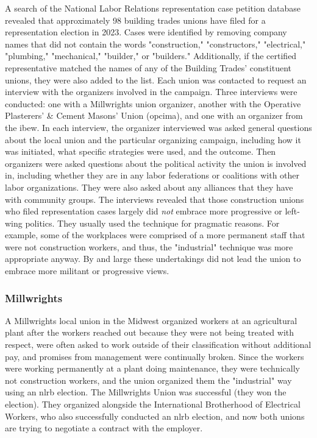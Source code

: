\documentclass[12pt]{article}
\begin{document}
A search of the National Labor Relations representation case petition database revealed that approximately 98 building trades unions have filed for a representation election in 2023. Cases were identified by removing company names that did not contain the words "construction," "constructors," "electrical," "plumbing," "mechanical," "builder," or "builders." Additionally, if the certified representative matched the names of any of the Building Trades’ constituent unions, they were also added to the list. Each union was contacted to request an interview with the organizers involved in the campaign. Three interviews were conducted: one with a Millwrights union organizer, another with the Operative Plasterers' \& Cement Masons' Union (\acrshort{opcima}), and one with an organizer from the \acrfull{ibew}. In each interview, the organizer interviewed was asked general questions about the local union and the particular organizing campaign, including how it was initiated, what specific strategies were used, and the outcome. Then organizers were asked questions about the political activity the union is involved in, including whether they are in any labor federations or coalitions with other labor organizations. They were also asked about any alliances that they have with community groups. The interviews revealed that those construction unions who filed representation cases largely did \emph{not} embrace more progressive or left-wing politics. They usually used the technique for pragmatic reasons. For example, some of the workplaces were comprised of a more permanent staff that were not construction workers, and thus, the "industrial" technique was more appropriate anyway. By and large these undertakings did not lead the union to embrace more militant or progressive views.

\subsubsection{Millwrights}

A Millwrights local union in the Midwest organized workers at an agricultural plant after the workers reached out because they were not being treated with respect, were often asked to work outside of their classification without additional pay, and promises from management were continually broken. Since the workers were working permanently at a plant doing maintenance, they were technically not construction workers, and the union organized them the "industrial" way using an \acrshort{nlrb} election. The Millwrights Union was successful (they won the election). They organized alongside the International Brotherhood of Electrical Workers, who also successfully conducted an \acrshort{nlrb} election, and now both unions are trying to negotiate a contract with the employer.
\end{document}
